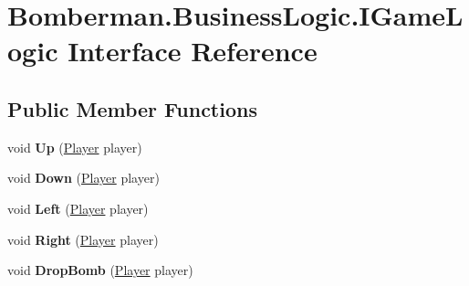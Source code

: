 \hypertarget{interface_bomberman_1_1_business_logic_1_1_i_game_logic}{}\section{Bomberman.\+Business\+Logic.\+I\+Game\+Logic Interface Reference}
\label{interface_bomberman_1_1_business_logic_1_1_i_game_logic}
\subsection*{Public Member Functions}
\begin{DoxyCompactItemize}
\item 
\mbox{\label{interface_bomberman_1_1_business_logic_1_1_i_game_logic_aee16a22620247c9b68b621f1a5a1e3b6}} 
void {\bfseries Up} (\mbox{\hyperlink{class_bomberman_1_1_model_1_1_player}{Player}} player)
\item 
\mbox{\label{interface_bomberman_1_1_business_logic_1_1_i_game_logic_a0a36d87b5f8a9ea022686108b6758706}} 
void {\bfseries Down} (\mbox{\hyperlink{class_bomberman_1_1_model_1_1_player}{Player}} player)
\item 
\mbox{\label{interface_bomberman_1_1_business_logic_1_1_i_game_logic_a7ee44a588f761030cd2e646b980d6948}} 
void {\bfseries Left} (\mbox{\hyperlink{class_bomberman_1_1_model_1_1_player}{Player}} player)
\item 
\mbox{\label{interface_bomberman_1_1_business_logic_1_1_i_game_logic_a8a68eb962cde3ff15f3d3ea9eca410f9}} 
void {\bfseries Right} (\mbox{\hyperlink{class_bomberman_1_1_model_1_1_player}{Player}} player)
\item 
\mbox{\label{interface_bomberman_1_1_business_logic_1_1_i_game_logic_afe1976ce4a310dfa520d2d0eff8c59e2}} 
void {\bfseries Drop\+Bomb} (\mbox{\hyperlink{class_bomberman_1_1_model_1_1_player}{Player}} player)
\item 
\mbox{\label{interface_bomberman_1_1_business_logic_1_1_i_game_logic_a24313ae64f2b6c1c7b627627081007bb}} 

\end{DoxyCompactItemize}
